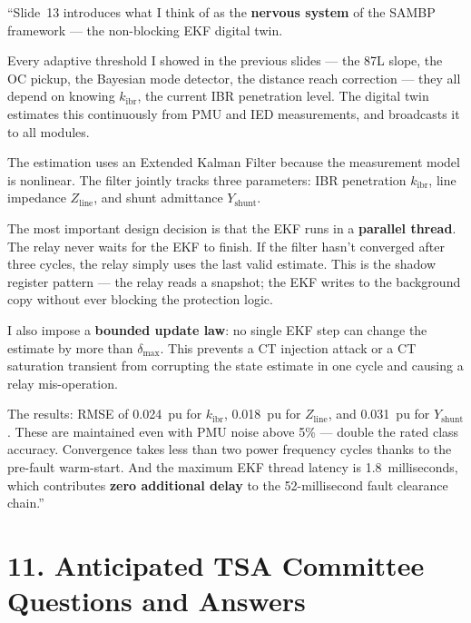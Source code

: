 \documentclass[12pt,a4paper]{article}
\begin{document}
\begin{speakbox}
``Slide~13 introduces what I think of as the \textbf{nervous system} of the SAMBP
framework — the non-blocking EKF digital twin.

Every adaptive threshold I showed in the previous slides — the 87L slope, the OC
pickup, the Bayesian mode detector, the distance reach correction — they all depend
on knowing $k_\mathrm{ibr}$, the current IBR penetration level. The digital twin
estimates this continuously from PMU and IED measurements, and broadcasts it to all
modules.

The estimation uses an Extended Kalman Filter because the measurement model is
nonlinear. The filter jointly tracks three parameters: IBR penetration $k_\mathrm{ibr}$,
line impedance $Z_\mathrm{line}$, and shunt admittance $Y_\mathrm{shunt}$.

The most important design decision is that the EKF runs in a \textbf{parallel
thread}. The relay never waits for the EKF to finish. If the filter hasn't
converged after three cycles, the relay simply uses the last valid estimate. This is
the shadow register pattern — the relay reads a snapshot; the EKF writes to the
background copy without ever blocking the protection logic.

I also impose a \textbf{bounded update law}: no single EKF step can change the
estimate by more than $\delta_\mathrm{max}$. This prevents a CT injection attack
or a CT saturation transient from corrupting the state estimate in one cycle and
causing a relay mis-operation.

The results: RMSE of 0.024~pu for $k_\mathrm{ibr}$, 0.018~pu for $Z_\mathrm{line}$,
and 0.031~pu for $Y_\mathrm{shunt}$. These are maintained even with PMU noise above
5\% — double the rated class accuracy. Convergence takes less than two power
frequency cycles thanks to the pre-fault warm-start. And the maximum EKF thread
latency is 1.8~milliseconds, which contributes \textbf{zero additional delay} to
the 52-millisecond fault clearance chain.''
\end{speakbox}

\section{11.\; Anticipated TSA Committee Questions and Answers}
\end{document}
